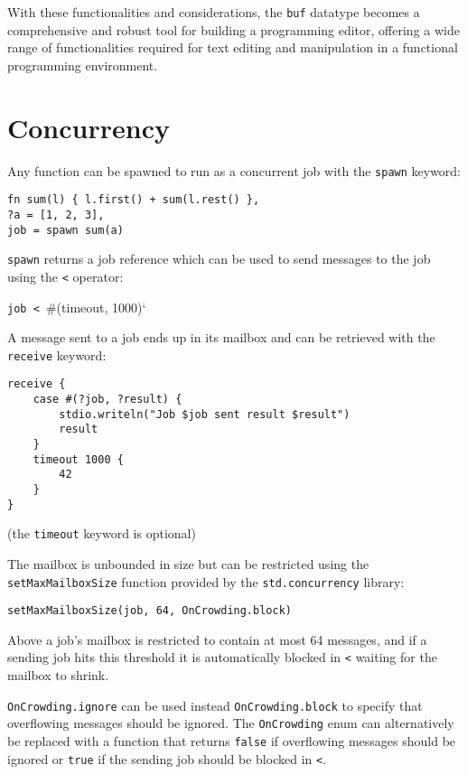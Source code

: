 With these functionalities and considerations, the \texttt{buf} datatype
becomes a comprehensive and robust tool for building a programming
editor, offering a wide range of functionalities required for text
editing and manipulation in a functional programming environment.

\hypertarget{concurrency}{%
\section{Concurrency}\label{concurrency}}

Any function can be spawned to run as a concurrent job with the
\texttt{spawn} keyword:

\begin{verbatim}
fn sum(l) { l.first() + sum(l.rest() },
?a = [1, 2, 3],
job = spawn sum(a)
\end{verbatim}

\texttt{spawn} returns a job reference which can be used to send
messages to the job using the \texttt{\textless{}\textbar{}} operator:

\texttt{job\ \textless{}\textbar{}\ }\#(timeout, 1000)`

A message sent to a job ends up in its mailbox and can be retrieved with
the \texttt{receive} keyword:

\begin{verbatim}
receive {
    case #(?job, ?result) {
        stdio.writeln("Job $job sent result $result")
        result
    }
    timeout 1000 {
        42
    }
}
\end{verbatim}

(the \texttt{timeout} keyword is optional)

The mailbox is unbounded in size but can be restricted using the
\texttt{setMaxMailboxSize} function provided by the
\texttt{std.concurrency} library:

\texttt{setMaxMailboxSize(job,\ 64,\ OnCrowding.block)}

Above a job's mailbox is restricted to contain at most 64 messages, and
if a sending job hits this threshold it is automatically blocked in
\texttt{\textless{}\textbar{}} waiting for the mailbox to shrink.

\texttt{OnCrowding.ignore} can be used instead \texttt{OnCrowding.block}
to specify that overflowing messages should be ignored. The
\texttt{OnCrowding} enum can alternatively be replaced with a function
that returns \texttt{false} if overflowing messages should be ignored or
\texttt{true} if the sending job should be blocked in
\texttt{\textless{}\textbar{}}.

